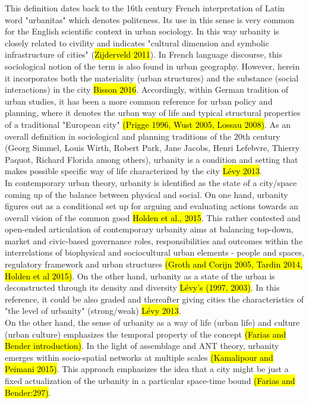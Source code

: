 \documentclass[11pt]{report}
\begin{document}
This definition dates back to the 16th century French interpretation of Latin word "urbanitas" which denotes politeness.
Its use in this sense is very common for the English scientific context in urban sociology.
In this way urbanity is closely related to civility  and indicates "cultural dimension and symbolic infrastructure of cities" (\hl{Zijderveld 2011}).
In French language discourse, this sociological notion of the term is also found in urban geography. However, herein it incorporates both the materiality (urban structures) and the substance (social interactions) in the city \hl{Bisson 2016}. 
Accordingly, within German tradition of urban studies, it has been a more common reference for urban policy and planning, where it denotes the urban way of life and typical structural properties of a traditional "European city" \hl{(Prigge 1996, Wust 2005, Lossau 2008)}. 
As an overall definition in sociological and planning traditions of the 20th century (Georg Simmel, Louis Wirth, Robert Park, Jane Jacobs, Henri Lefebvre, Thierry Paquot, Richard Florida among others), urbanity is a condition and setting that makes possible specific way of life characterized by the city \hl{Lévy 2013}. 
\\
In contemporary urban theory, urbanity is identified as the state of a city/space coming up of the balance between physical and social.
On one hand, urbanity figures out as a conditional set up for arguing and evaluating actions towards an overall vision of the common good \hl{Holden et al., 2015}.
This rather contested and open-ended articulation of contemporary urbanity aims at balancing top-down, market and civic-based governance roles, responsibilities and outcomes within the interrelations of biophysical and sociocultural urban elements - people and spaces, regulatory framework and urban structures \hl{(Groth and Corijn 2005, Tardin 2014, Holden et al 2015)}.
On the other hand, urbanity as a state of the urban is deconstructed through its density and diversity \hl{Lévy's (1997, 2003)}. In this reference, it could be also graded and thereafter giving cities the characteristics of "the level of urbanity" (strong/weak) \hl{Lévy 2013}.
\\
On the other hand, the sense of urbanity as a way of life (urban life) and culture (urban culture) emphasizes the temporal property of the concept \hl{(Farias and Bender introduction)}.
In the light of assemblage and ANT theory, urbanity emerges within socio-spatial networks at multiple scales \hl{(Kamalipour and Peimani 2015)}.
This approach emphasizes the idea that a city might be just a fixed actualization of the urbanity in a particular space-time bound \hl{(Farias and Bender:297)}.
\end{document}
